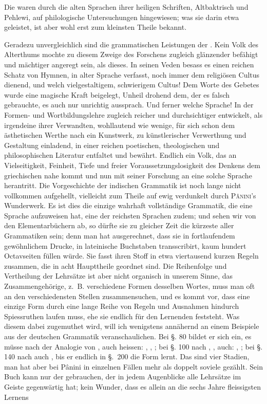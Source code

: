 \label{I.IV.parsi}
Die  waren durch die alten Sprachen ihrer heiligen Schriften, Altbaktrisch und Pehlewi, auf philologische Untersuchungen hingewiesen; was sie darin etwa geleistet, ist aber wohl erst zum kleinsten Theile bekannt.

\label{I.IV.inder}
Geradezu unvergleichlich sind die grammatischen Leistungen der . Kein Volk des Alterthums mochte zu diesem Zweige des Forschens zugleich glänzender befähigt und mächtiger angeregt sein, als dieses. In seinen Veden besass es einen reichen Schatz von Hymnen, in alter Sprache verfasst, noch immer dem religiösen Cultus dienend, und welch vielgestaltigem, schwierigem Cultus! Dem Worte des Gebetes wurde eine magische Kraft beigelegt, Unheil drohend dem, der es falsch gebrauchte, es auch nur unrichtig aussprach. Und ferner welche Sprache! In der Formen- und Wortbildungslehre zugleich reicher und durchsichtiger entwickelt, als irgendeine ihrer Verwandten, wohllautend wie wenige, für sich schon dem ästhetischen Werthe nach ein Kunstwerk, zu künstlerischer Verwerthung und Gestaltung einladend, in einer reichen poetischen, theologischen und philosophischen Literatur entfaltet und bewährt. Endlich ein Volk, das an Vielseitigkeit, Feinheit, Tiefe \label{fp.22} und freier Voraussetzungslosigkeit des Denkens dem griechischen nahe kommt und nun mit seiner Forschung an eine solche Sprache herantritt. Die Vorgeschichte der indischen Grammatik ist noch lange nicht vollkommen aufgehellt, vielleicht zum Theile auf ewig verdunkelt durch \textsc{Pânini}’s Wunderwerk. Es ist dies die einzige wahrhaft vollständige Grammatik, die eine Sprache aufzuweisen hat, eine der reichsten Sprachen zudem; und sehen wir von den Elementarbüchern ab, so dürfte sie zu gleicher Zeit die kürzeste aller Grammatiken sein; denn man hat ausgerechnet, dass sie in fortlaufendem gewöhnlichem Drucke, in lateinische Buchstaben \label{sp.23} transscribirt, kaum hundert Octavseiten füllen würde. Sie fasst ihren Stoff in etwa viertausend kurzen Regeln zusammen, die in acht Haupttheile geordnet sind. Die Reihenfolge und Vertheilung der Lehrsätze ist aber nicht organisch in unserem Sinne, das Zusammengehörige, z.~B. verschiedene Formen desselben Wortes, muss man oft an den verschiedensten Stellen zusammensuchen, und es kommt vor, dass eine einzige Form durch eine lange Reihe von Regeln und Ausnahmen hindurch Spiessruth\-en laufen muss, ehe sie endlich für den Lernenden feststeht. Was diesem dabei zugemuthet wird, will ich wenigstens annähernd an einem Beispiele aus der deutschen Grammatik veranschaulichen. Bei §. 80 bildet er sich ein, es müsse nach der Analogie von ,  auch heissen: , , ; bei §. 100 nach , , auch: , ; bei §. 140 nach  auch , bis er endlich in §.~200 die Form  lernt. Das sind vier Stadien, man hat aber bei Pânini in einzelnen Fällen mehr als doppelt soviele gezählt. Sein Buch kann nur der gebrauchen, der in jedem Augenblicke alle Lehrsätze im Geiste gegenwärtig hat; kein Wunder, dass es allein an die sechs Jahre fleissigsten Lernens 